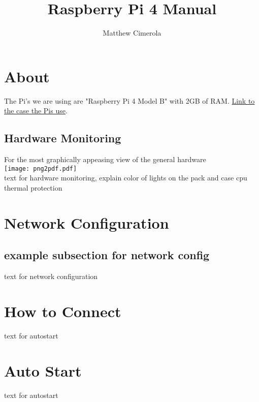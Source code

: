 \documentclass{article}
\author{Matthew Cimerola}
\title{Raspberry Pi 4 Manual}
\begin{document}
\maketitle

\tableofcontents
\newpage
\section{About}
The Pi's we are using are "Raspberry Pi 4 Model B" with 2GB of RAM. \href{https://www.amazon.com/Flirc-Raspberry-Pi-Case-Silver/dp/B07WG4DW52/ref=sr_1_5?keywords=Raspberry+Pi+4+Case&qid=1658852531&sr=8-5}{Link to the case the Pis use}. 
\subsection{Hardware Monitoring}
For the most graphically appeasing view of the general hardware \\
\texttt{[image: png2pdf.pdf]} \\
text for hardware monitoring, explain color of lights on the pack and case cpu thermal protection


\newpage
\section{Network Configuration}
\subsection{example subsection for network config}
text for network configuration

\newpage
\section{How to Connect}
text for autostart


\newpage
\section{Auto Start}
text for autostart
\end{document}
